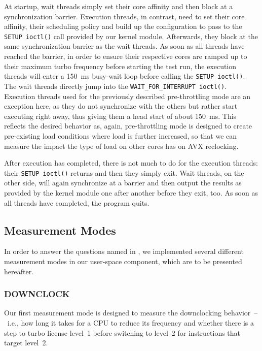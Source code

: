 \noindent At startup, wait threads simply set their core affinity and then block at a synchronization barrier. Execution threads, in contrast, need to set their core affinity, their scheduling policy and build up the configuration to pass to the \texttt{SETUP ioctl()} call provided by our kernel module. Afterwards, they block at the same synchronization barrier as the wait threads. As soon as all threads have reached the barrier, in order to ensure their respective cores are ramped up to their maximum turbo frequency before starting the test run, the execution threads will enter a \SI{150}{\milli\second} busy-wait loop before calling the \texttt{SETUP ioctl()}. The wait threads directly jump into the \texttt{WAIT\_FOR\_INTERRUPT ioctl()}. Execution threads used for the previously described pre-throttling mode are an exception here, as they do not synchronize with the others but rather start executing right away, thus giving them a head start of about \SI{150}{\milli\second}. This reflects the desired behavior as, again, pre-throttling mode is designed to create pre-existing load conditions where load is further increased, so that we can measure the impact the type of load on other cores has on \gls{AVX} reclocking.

After execution has completed, there is not much to do for the execution threads: their \texttt{SETUP ioctl()} returns and then they simply exit. Wait threads, on the other side, will again synchronize at a barrier and then output the results as provided by the kernel module one after another before they exit, too. As soon as all threads have completed, the program quits.

\subsection{Measurement Modes}
\label{sec:analysis:design:measurementmodes}

In order to answer the questions named in , we implemented several different measurement modes in our user-space component, which are to be presented hereafter.

\subsubsection{DOWNCLOCK}
\label{sec:analysis:design:measurementmodes:downclock}

Our first measurement mode is designed to measure the downclocking behavior~--~i.e., how long it takes for a \gls{CPU} to reduce its frequency and whether there is a step to turbo license level~1 before switching to level~2 for instructions that target level~2.

